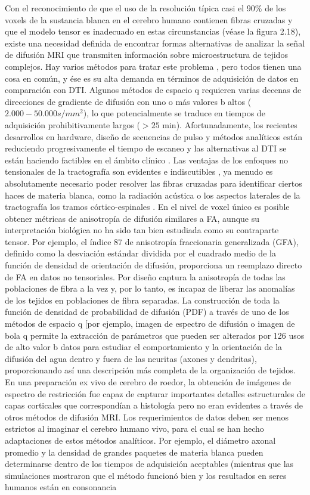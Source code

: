 \documentclass[12pt,a5,twoside]{book}
\begin{document}
Con el reconocimiento de que el uso de la resolución típica casi el 90\% de los voxels de la sustancia blanca en el cerebro humano contienen fibras cruzadas \citep{119} y que el modelo tensor es inadecuado en estas circunstancias (véase la figura 2.18), existe una necesidad definida de encontrar formas alternativas de analizar la señal de difusión MRI que transmiten información sobre microestructura de tejidos complejos. Hay varios métodos para tratar este problema \citep{120}, pero todos tienen una cosa en común, y ése es su alta demanda en términos de adquisición de datos en comparación con DTI. Algunos métodos de espacio q requieren varias decenas de direcciones de gradiente de difusión con uno o más valores b altos ($2.000-50.000 s/mm^{2}$), lo que potencialmente se traduce en tiempos de adquisición prohibitivamente largos ($> 25$ min). Afortunadamente, los recientes desarrollos en hardware, diseño de secuencias de pulso y métodos analíticos \citep{Tuch_2002,121} están reduciendo progresivamente el tiempo de escaneo y las alternativas al DTI se están haciendo factibles en el ámbito clínico \citep{122}. Las ventajas de los enfoques no tensionales de la tractografía son evidentes e indiscutibles \citep{123}, ya menudo es absolutamente necesario poder resolver las fibras cruzadas para identificar ciertos haces de materia blanca, como la radiación acústica o los aspectos laterales de la tractografía los tramos córtico-espinales \citep{124}. En el nivel de voxel único es posible obtener métricas de anisotropía de difusión similares a FA, aunque su interpretación biológica no ha sido tan bien estudiada como su contraparte tensor. Por ejemplo, el índice 87 de anisotropía fraccionaria generalizada (GFA), definido como la desviación estándar dividida por el cuadrado medio de la función de densidad de orientación de difusión, proporciona un reemplazo directo de FA en datos no tensoriales. Por diseño captura la anisotropía de todas las poblaciones de fibra a la vez y, por lo tanto, es incapaz de liberar las anomalías de los tejidos en poblaciones de fibra separadas. La construcción de toda la función de densidad de probabilidad de difusión (PDF) a través de uno de los métodos de espacio q [por ejemplo, imagen de espectro de difusión \citep{125} o imagen de bola q \citep{Tuch_2004} permite la extracción de parámetros que pueden ser alterados por 126 usos de alto valor b datos para estudiar el comportamiento y la orientación de la difusión del agua dentro y fuera de las neuritas (axones y dendritas), proporcionando así una descripción más completa de la organización de tejidos. En una preparación ex vivo de cerebro de roedor, la obtención de imágenes de espectro de restricción fue capaz de capturar importantes detalles estructurales de capas corticales que correspondían a histología pero no eran evidentes a través de otros métodos de difusión MRI. Los requerimientos de datos deben ser menos estrictos al imaginar el cerebro humano vivo, para el cual se han hecho adaptaciones de estos métodos analíticos. Por ejemplo, el diámetro axonal promedio y la densidad de grandes paquetes de materia blanca pueden determinarse dentro de los tiempos de adquisición aceptables (mientras que las simulaciones mostraron que el método funcionó bien y los resultados en seres humanos están en consonancia 
\end{document}
